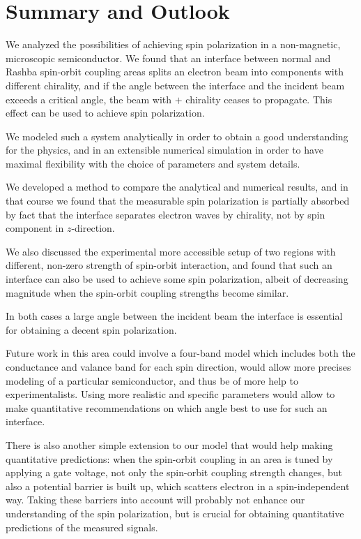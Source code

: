 \chapter{Summary and Outlook}
\label{sec:summary}

We analyzed the possibilities of achieving spin polarization in a
non-magnetic, microscopic semiconductor. We found that an interface between
normal and Rashba spin-orbit coupling areas splits an electron beam into
components with different chirality, and if the angle between the interface
and the incident beam exceeds a critical angle, the beam with $+$ chirality
ceases to propagate. This effect can be used to achieve spin polarization.

We modeled such a system analytically in order to obtain a good understanding
for the physics, and in an extensible numerical simulation in order to have
maximal flexibility with the choice of parameters and system details.

We developed a method to compare the analytical and numerical results, and in
that course we found that the measurable spin polarization is partially
absorbed by fact that the
interface separates electron waves by chirality, not by spin component
in $z$-direction.

We also discussed the experimental more accessible setup of two regions with
different, non-zero strength of spin-orbit interaction, and found that such an
interface can also be used to achieve some spin polarization, albeit
of decreasing magnitude when the spin-orbit coupling strengths become similar. 

In both cases a large angle between the incident beam the interface is
essential for obtaining a decent spin polarization.


Future work in this area could involve a four-band model which includes both
the conductance and valance band for each spin direction, would
allow more precises modeling of a particular semiconductor, and thus be of
more help to experimentalists. Using more realistic and specific parameters
would allow to make quantitative recommendations on which angle best to use
for such an interface.

There is also another simple extension to our model that would help making
quantitative predictions: when the spin-orbit coupling in an area is tuned by
applying a gate voltage, not only the spin-orbit coupling strength changes,
but also a potential barrier is built up, which scatters electron in a
spin-independent way. Taking these barriers into account will probably not
enhance our understanding of the spin polarization, but is crucial for
obtaining quantitative predictions of the measured signals.

